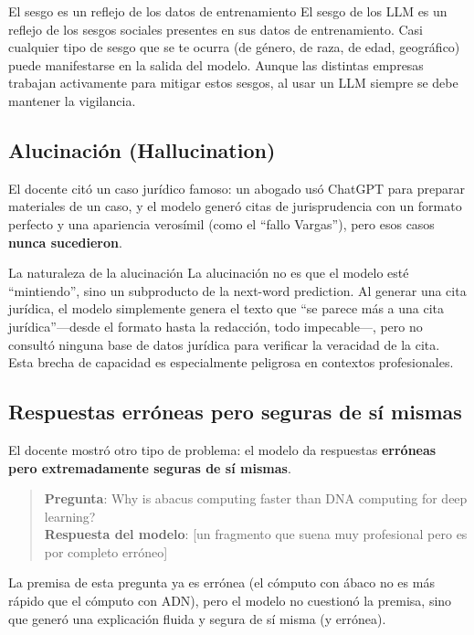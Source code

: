\begin{warningbox}{El sesgo es un reflejo de los datos de entrenamiento}
El sesgo de los LLM es un reflejo de los sesgos sociales presentes en sus datos de entrenamiento. Casi cualquier tipo de sesgo que se te ocurra (de género, de raza, de edad, geográfico) puede manifestarse en la salida del modelo. Aunque las distintas empresas trabajan activamente para mitigar estos sesgos, al usar un LLM siempre se debe mantener la vigilancia.
\end{warningbox}

\subsection{Alucinación (Hallucination)}

El docente citó un caso jurídico famoso: un abogado usó ChatGPT para preparar materiales de un caso, y el modelo generó citas de jurisprudencia con un formato perfecto y una apariencia verosímil (como el ``fallo Vargas''), pero esos casos \textbf{nunca sucedieron}.

\begin{importantbox}{La naturaleza de la alucinación}
La alucinación no es que el modelo esté ``mintiendo'', sino un subproducto de la next-word prediction. Al generar una cita jurídica, el modelo simplemente genera el texto que ``se parece más a una cita jurídica''—desde el formato hasta la redacción, todo impecable—, pero no consultó ninguna base de datos jurídica para verificar la veracidad de la cita. Esta brecha de capacidad es especialmente peligrosa en contextos profesionales.
\end{importantbox}

\subsection{Respuestas erróneas pero seguras de sí mismas}

El docente mostró otro tipo de problema: el modelo da respuestas \textbf{erróneas pero extremadamente seguras de sí mismas}.

\begin{quote}
\textbf{Pregunta}: Why is abacus computing faster than DNA computing for deep learning? \\
\textbf{Respuesta del modelo}: {[}un fragmento que suena muy profesional pero es por completo erróneo{]}
\end{quote}

La premisa de esta pregunta ya es errónea (el cómputo con ábaco no es más rápido que el cómputo con ADN), pero el modelo no cuestionó la premisa, sino que generó una explicación fluida y segura de sí misma (y errónea).

